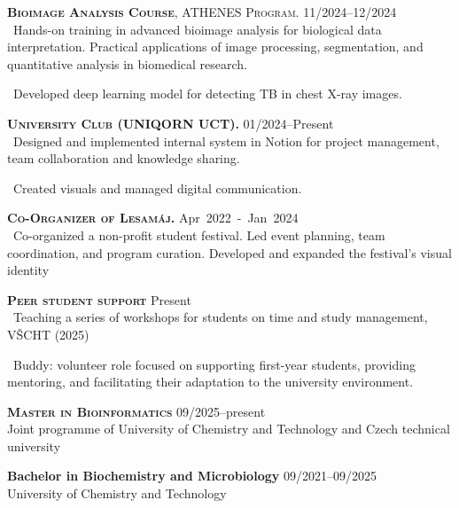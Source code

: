 \documentclass[11pt, a4paper]{article}
\newcommand{\dates}[1]{\hfill\mbox{#1}}
\newcommand{\SC}[1]{\textls[80]{\MakeUppercase{#1}}}
\newcommand{\smaller}[1]{{\small\textbullet\ #1}}
\newcommand{\headright}[1]{%
  \vspace*{2.5ex}%
  {\color{cvblue}\Large\bfseries \SC{#1}}\par
  \vspace*{-2ex}{\color{cvblue}\hrulefill}\par
}
\begin{document}
\begin{minipage}[t][\textheight][t]{0.56\textwidth}
\textsc{\textbf{Bioimage Analysis Course}, ATHENES Program.} \dates{11/2024--12/2024} \\
\smaller{Hands-on training in advanced bioimage analysis for biological data interpretation. Practical applications of image processing, segmentation, and quantitative analysis in biomedical research.}

\smaller{Developed deep learning model for detecting TB in chest X-ray images.}

\textsc{\textbf{University Club (UNIQORN UCT).}} \dates{01/2024--Present} \\
\smaller{Designed and implemented internal system in Notion for project management, team collaboration and knowledge sharing.}

\smaller{Created visuals and managed digital communication.}

\textsc{\textbf{Co-Organizer of Lesamáj.}} \dates{Apr 2022 - Jan 2024} \\
\smaller{Co-organized a non-profit student festival. Led event planning, team coordination, and program curation. Developed and expanded the festival’s visual identity}


\textsc{\textbf{Peer student support}} \dates{Present} \\
\smaller{Teaching a series of workshops for students on time and study management, VŠCHT (2025)}

\smaller{Buddy: volunteer role focused on supporting first-year students, providing mentoring, and facilitating their adaptation to the university environment.}


\headright{Education}

\textsc{\textbf{Master in Bioinformatics}} 
\dates{09/2025--present} \\
Joint programme of University of Chemistry and Technology and Czech technical university

\textbf{Bachelor in Biochemistry and Microbiology}
\dates{09/2021--09/2025} \\
University of Chemistry and Technology

\end{minipage}
\end{document}

